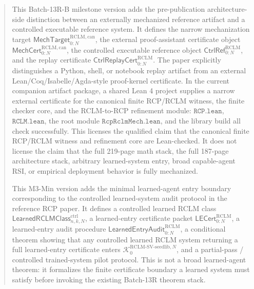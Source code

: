 \documentclass[11pt,a4paper]{article}
\newcommand{\Kcal}{\mathcal K}
\newcommand{\RCLM}{\mathrm{RCLM}}
\begin{document}
\begin{abstract}
This Batch-13R-B milestone version adds the pre-publication architecture-side distinction between an externally mechanized reference artifact and a controlled executable reference system.  It defines the narrow mechanization target \(\mathsf{MechTarget}_{0:N}^{\RCLM,\mathrm{can}}\), the external proof-assistant certificate object \(\mathsf{MechCert}_{0:N}^{\RCLM,\mathrm{can}}\), the controlled executable reference object \(\mathsf{CtrlRef}_{0:N}^{\RCLM}\), and the replay certificate \(\mathsf{CtrlReplayCert}_{0:N}^{\RCLM}\).  The paper explicitly distinguishes a Python, shell, or notebook replay artifact from an external Lean/Coq/Isabelle/Agda-style proof-kernel certificate.  In the current companion artifact package, a shared Lean 4 project supplies a narrow external certificate for the canonical finite RCP/RCLM witness, the finite checker core, and the RCLM-to-RCP refinement module: \(\texttt{RCP.lean}\), \(\texttt{RCLM.lean}\), the root module \(\texttt{RcpRclmMech.lean}\), and the library build all check successfully.  This licenses the qualified claim that the canonical finite RCP/RCLM witness and refinement core are Lean-checked.  It does not license the claim that the full 219-page math stack, the full 187-page architecture stack, arbitrary learned-system entry, broad capable-agent RSI, or empirical deployment behavior is fully mechanized.

This M3-Min version adds the minimal learned-agent entry boundary corresponding to the controlled learned-system audit protocol in the reference RCP paper.  It defines a controlled learned RCLM class \(\mathsf{LearnedRCLMClass}_{n,k,N}^{\mathrm{ctrl}}\), a learned-entry certificate packet \(\mathsf{LECert}_{0:N}^{\RCLM}\), a learned-entry audit procedure \(\mathsf{LearnedEntryAudit}_{0:N}^{\RCLM}\), a conditional theorem showing that any controlled learned RCLM system returning a full learned-entry certificate enters \(\Kcal_0^{\RCLM\text{-}\mathrm{SV\mbox{-}seedlib},N}\), and a partial-pass / controlled trained-system pilot protocol.  This is not a broad learned-agent theorem: it formalizes the finite certificate boundary a learned system must satisfy before invoking the existing Batch-13R theorem stack.

\end{abstract}
\end{document}

